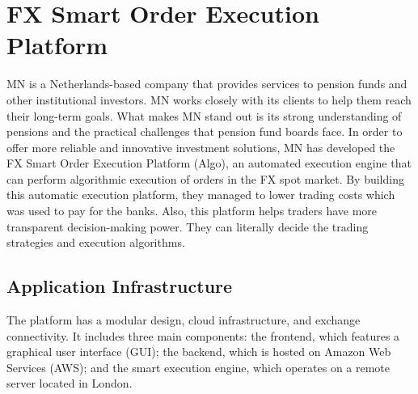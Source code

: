 





\section{FX Smart Order Execution Platform}
MN is a Netherlands-based company that provides services to pension funds and other institutional investors. MN works closely with its clients to help them reach their long-term goals. What makes MN stand out is its strong understanding of pensions and the practical challenges that pension fund boards face. In order to offer more reliable and innovative investment solutions, MN has developed the FX Smart Order Execution Platform (Algo), an automated execution engine that can perform algorithmic execution of orders in the FX spot market. By building this automatic execution platform, they managed to lower trading costs which was used to pay for the banks. Also, this platform helps traders have more transparent decision-making power. They can literally decide the trading strategies and execution algorithms.

\subsection{Application Infrastructure}
The platform has a modular design, cloud infrastructure, and exchange connectivity. It includes three main components: the frontend, which features a graphical user interface (GUI); the backend, which is hosted on Amazon Web Services (AWS); and the smart execution engine, which operates on a remote server located in London.


